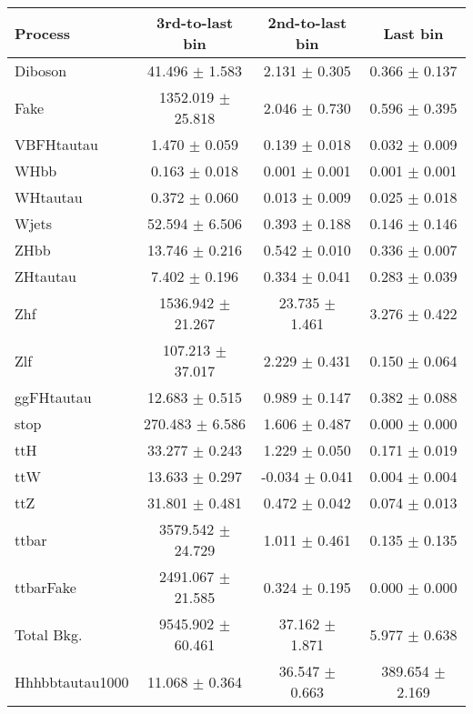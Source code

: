 \begin{tabular}{lccc}
  \toprule
  Process & 3rd-to-last bin & 2nd-to-last bin & Last bin \\
  \midrule
  Diboson &	41.496	$\pm$ 1.583	& 2.131	$\pm$ 0.305	& 0.366	$\pm$ 0.137 \\
  Fake &	1352.019	$\pm$ 25.818	& 2.046	$\pm$ 0.730	& 0.596	$\pm$ 0.395 \\
  VBFHtautau &	1.470	$\pm$ 0.059	& 0.139	$\pm$ 0.018	& 0.032	$\pm$ 0.009 \\
  WHbb &	0.163	$\pm$ 0.018	& 0.001	$\pm$ 0.001	& 0.001	$\pm$ 0.001 \\
  WHtautau &	0.372	$\pm$ 0.060	& 0.013	$\pm$ 0.009	& 0.025	$\pm$ 0.018 \\
  Wjets &	52.594	$\pm$ 6.506	& 0.393	$\pm$ 0.188	& 0.146	$\pm$ 0.146 \\
  ZHbb &	13.746	$\pm$ 0.216	& 0.542	$\pm$ 0.010	& 0.336	$\pm$ 0.007 \\
  ZHtautau &	7.402	$\pm$ 0.196	& 0.334	$\pm$ 0.041	& 0.283	$\pm$ 0.039 \\
  Zhf &		1536.942	$\pm$ 21.267	& 23.735	$\pm$ 1.461	& 3.276	$\pm$ 0.422 \\
  Zlf &		107.213	$\pm$ 37.017	& 2.229	$\pm$ 0.431	& 0.150	$\pm$ 0.064 \\
  ggFHtautau &	12.683	$\pm$ 0.515	& 0.989	$\pm$ 0.147	& 0.382	$\pm$ 0.088 \\
  stop &	270.483	$\pm$ 6.586	& 1.606	$\pm$ 0.487	& 0.000	$\pm$ 0.000 \\
  ttH &		33.277	$\pm$ 0.243	& 1.229	$\pm$ 0.050	& 0.171	$\pm$ 0.019 \\
  ttW &		13.633	$\pm$ 0.297	& -0.034	$\pm$ 0.041	& 0.004	$\pm$ 0.004 \\
  ttZ &		31.801	$\pm$ 0.481	& 0.472	$\pm$ 0.042	& 0.074	$\pm$ 0.013 \\
  ttbar &	3579.542	$\pm$ 24.729	& 1.011	$\pm$ 0.461	& 0.135	$\pm$ 0.135 \\
  ttbarFake &	2491.067	$\pm$ 21.585	& 0.324	$\pm$ 0.195	& 0.000	$\pm$ 0.000 \\
  \midrule
  Total Bkg. &  9545.902	$\pm$ 60.461	& 37.162 $\pm$ 1.871	& 5.977	$\pm$ 0.638 \\
  \midrule
  Hhhbbtautau1000 &	11.068	$\pm$ 0.364	& 36.547	$\pm$ 0.663	& 389.654	$\pm$ 2.169 \\
  \bottomrule
\end{tabular}

